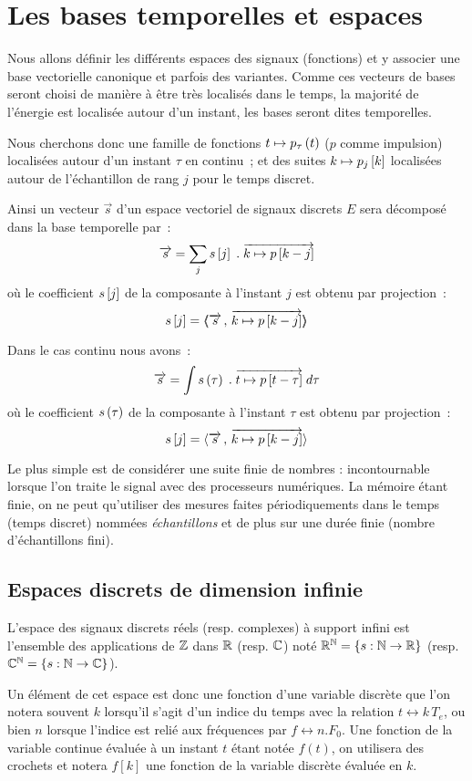 \section{Les bases temporelles et espaces}
Nous allons définir les différents espaces des signaux (fonctions) et
y associer une base vectorielle \og canonique\fg{} et parfois des
variantes. Comme ces vecteurs de bases seront choisi de manière à être
très localisés dans le temps, la majorité de l'énergie est localisée
autour d'un instant, les bases seront dites temporelles.

Nous cherchons donc une famille de fonctions $t\mapsto p_\tau\left(t\right)$
($p$ comme impulsion) localisées autour d'un instant $\tau$ en
continu~; et des suites $k\mapsto p_{j}\left[k\right]$ localisées autour de
l'échantillon de rang $j$ pour le temps discret.

Ainsi un vecteur $\vec{s}$ d'un espace vectoriel de signaux discrets $E$ sera décomposé dans la base temporelle par~:
$$ \overrightarrow{s} = \sum\limits_j s\left[j\right]\;.\;\overrightarrow{k \mapsto p\left[k-j\right]}$$
où le coefficient $s\left[j\right]$ de la composante à l'instant $j$ est obtenu
par projection~:
$$ s\left[j\right] = \langle\!\!\langle\overrightarrow{s}\,,\,\overrightarrow{k \mapsto p\left[k-j\right]}\rangle\!\!\rangle$$

Dans le cas continu nous avons~:
$$ \overrightarrow{s} = \int s\left(\tau\right)\;.\;\overrightarrow{t \mapsto p\left[t-\tau\right]}\; d\tau$$
où le coefficient $s\left(\tau\right)$ de la composante à l'instant $\tau$ est obtenu
par projection~:
$$ s\left[j\right] = \langle\overrightarrow{s}\,,\,\overrightarrow{k \mapsto p\left[k-j\right]}\rangle$$

Le plus simple est de considérer une suite finie de nombres :
incontournable lorsque l'on traite le signal avec des processeurs
numériques.  La mémoire étant finie, on ne peut qu'utiliser des
mesures faites périodiquements dans le temps (temps discret) nommées
\emph{échantillons} et de plus sur une durée finie (nombre
d'échantillons fini).


\subsection{Espaces discrets de dimension infinie}

L'espace des signaux discrets réels (resp. complexes) à support infini
est l'ensemble des applications de $\mathbb{Z}$ dans $\mathbb{R}$ (resp. $\mathbb{C}$) noté
$\mathbb{R}^{\mathbb{N}} = \left\{s : \mathbb{N} \to \mathbb{R} \right\}$ (resp.
$\mathbb{C}^{\mathbb{N}} = \left\{s : \mathbb{N} \to \mathbb{C} \right\}$).


Un élément de cet espace est donc une fonction d'une variable discrète
que l'on notera souvent $k$ lorsqu'il s'agit d'un indice du temps avec
la relation $t \leftrightarrow k\,T_e$, ou bien $n$ lorsque l'indice
est relié aux fréquences par $f \leftrightarrow n.F_0$. Une fonction
de la variable continue évaluée à un instant $t$ étant notée $f(t)$,
on utilisera des crochets et notera $f[k]$ une fonction de la variable
discrète évaluée en $k$.

